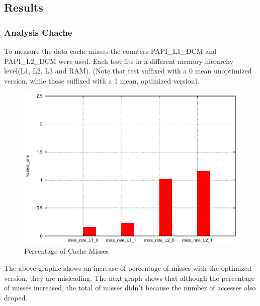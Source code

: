 \documentclass[a4paper,10pt,openright,openbib,twocolumn]{article}
\begin{document}
\subsection{Results}
\subsubsection{Analysis Chache}

 To measure the data cache misses the counters PAPI\_L1\_DCM and PAPI\_L2\_DCM were used. Each test fits in a different memory hierarchy level(L1, L2, L3 and RAM). (Note that test suffixed with a 0 mean unoptimized version, while those suffixed with a 1 mean, optimized version).

\begin{figure}[!htp]
	\centering
	\begin{minipage}[t]{\columnwidth}
		\includegraphics[width=\textwidth]{images/caches.eps}
		\caption{Percentage of Cache Misses \label{fig:cachel1}}
	\end{minipage}
\end{figure}

The above graphic shows an increase of percentage of misses with the optimized version, they are misleading. The next graph shows that although the percentage of misses increased, the total of misses didn't because the number of accesses also droped.
\end{document}
